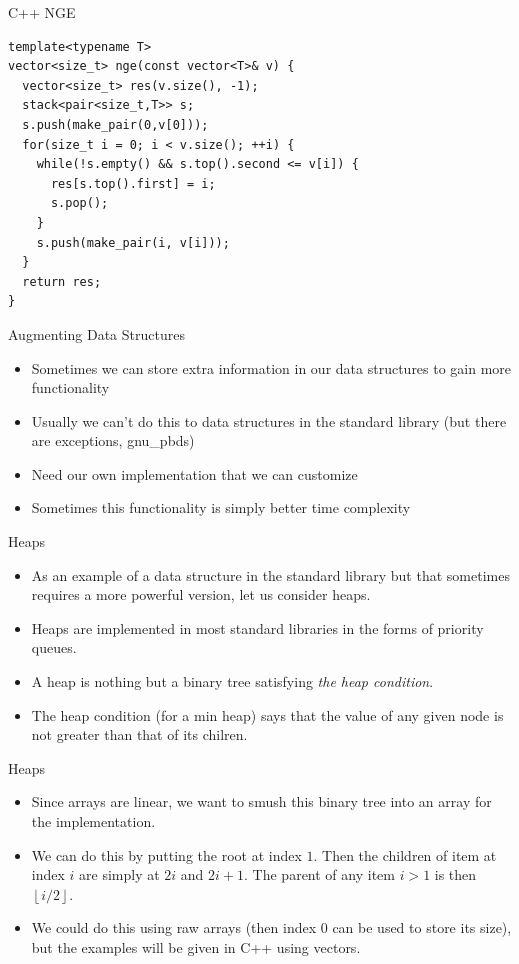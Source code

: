 \documentclass{beamer}
\newcommand\floor[1]{\left\lfloor#1\right\rfloor}
\begin{document}
\begin{frame}{C++ NGE}
    \begin{verbatim}
template<typename T>
vector<size_t> nge(const vector<T>& v) {
  vector<size_t> res(v.size(), -1);
  stack<pair<size_t,T>> s; 
  s.push(make_pair(0,v[0]));
  for(size_t i = 0; i < v.size(); ++i) {
    while(!s.empty() && s.top().second <= v[i]) {
      res[s.top().first] = i; 
      s.pop(); 
    }
    s.push(make_pair(i, v[i])); 
  }
  return res; 
}
    \end{verbatim}
\end{frame}


\begin{frame}[plain]{Augmenting Data Structures}
    \begin{itemize}
        \item Sometimes we can store extra information in our data structures to gain more functionality
        \item Usually we can't do this to data structures in the standard library (but there are exceptions, gnu\_pbds)
        \item Need our own implementation that we can customize
        \item Sometimes this functionality is simply better time complexity
    \end{itemize}
\end{frame}

\begin{frame}[plain]{Heaps}
    \begin{itemize}
        \item As an example of a data structure in the standard library but that sometimes requires a more powerful version, let us consider heaps.
        \item Heaps are implemented in most standard libraries in the forms of priority queues.
        \item A heap is nothing but a binary tree satisfying \textit{the heap condition}.
        \item The heap condition (for a min heap) says that the value of any given node is not greater than that of its chilren.
    \end{itemize}
\end{frame}

\begin{frame}[plain]{Heaps}
    \begin{itemize}
        \item Since arrays are linear, we want to smush this binary tree into an array for the implementation.
        \item We can do this by putting the root at index $1$. Then the children of item at index $i$ are simply at $2i$ and $2i+1$. The parent of any item $i > 1$ is then $\floor{i/2}$.
        \item We could do this using raw arrays (then index $0$ can be used to store its size), but the examples will be given in C++ using vectors.
    \end{itemize}
\end{frame}
\end{document}
